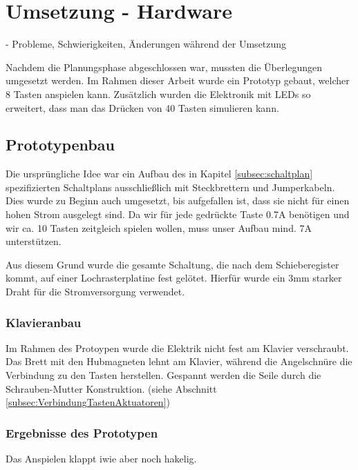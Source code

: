 
\chapter{Umsetzung - Hardware} \label{umsetzungHW}

\nocite{*}
- Probleme, Schwierigkeiten, Änderungen während der Umsetzung

Nachdem die Planungsphase abgeschlossen war, mussten die Überlegungen umgesetzt werden.
Im Rahmen dieser Arbeit wurde ein Prototyp gebaut, welcher 8 Tasten anspielen kann.
Zusätzlich wurden die Elektronik mit LEDs so erweitert, dass man das Drücken von 40 Tasten simulieren kann.

\section{Prototypenbau}

Die ursprüngliche Idee war ein Aufbau des in Kapitel \ref{subsec:schaltplan} spezifizierten Schaltplans ausschließlich mit Steckbrettern und Jumperkabeln.
Dies wurde zu Beginn auch umgesetzt, bis aufgefallen ist, dass sie nicht für einen hohen Strom ausgelegt sind.
Da wir für jede gedrückte Taste 0.7A benötigen und wir ca. 10 Tasten zeitgleich spielen wollen, muss unser Aufbau mind. 7A unterstützen.

Aus diesem Grund wurde die gesamte Schaltung, die nach dem Schieberegister kommt, auf einer Lochrasterplatine fest gelötet.
Hierfür wurde ein 3mm starker Draht für die Stromversorgung verwendet.

\subsection{Klavieranbau}
Im Rahmen des Protoypen wurde die Elektrik nicht fest am Klavier verschraubt.
Das Brett mit den Hubmagneten lehnt am Klavier, während die Angelschnüre die Verbindung zu den Tasten herstellen.
Gespannt werden die Seile durch die Schrauben-Mutter Konstruktion. (siehe Abschnitt \ref{subsec:VerbindungTastenAktuatoren})

\subsection{Ergebnisse des Prototypen}

Das Anspielen klappt iwie aber noch hakelig.


